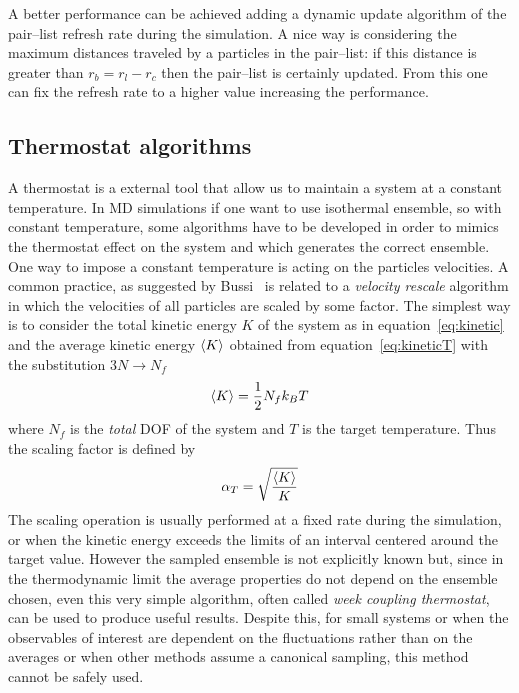 A better performance can be achieved adding a dynamic update algorithm of the pair--list refresh rate during the simulation. A nice way is considering the maximum distances traveled by a particles in the pair--list: if this distance is greater than $r_b = r_l - r_c$ then the pair--list is certainly updated. From this one can fix the refresh rate to a higher value increasing the performance.

\subsection{Thermostat algorithms} %
A thermostat is a external tool that allow us to maintain a system at a constant temperature. In \ac{MD} simulations if one want to use isothermal ensemble, so with constant temperature, some algorithms have to be developed in order to mimics the thermostat effect on the system and which generates the correct ensemble. One way to impose a constant temperature is acting on the particles velocities. A common practice, as suggested by Bussi \etal\, \cite{Bussi} is related to a \textit{velocity rescale} algorithm in which the velocities of all particles are scaled by some factor. The simplest way is to consider the total kinetic energy $K$ of the system as in equation~\eqref{eq:kinetic} and the average kinetic energy $\left \langle K \right \rangle$ obtained from equation~\eqref{eq:kineticT} with the substitution $3N\rightarrow N_f$
\begin{equation*}
	\left \langle K \right \rangle = \frac{1}{2}N_f k_B T
\end{equation*}
where $N_f$ is the \textit{total} \ac{DOF} of the system and $T$ is the target temperature. Thus the scaling factor is defined by
\begin{equation*}
	\alpha_{T} = \sqrt{\frac{\left \langle K \right \rangle}{K}}
\end{equation*}
The scaling operation is usually performed at a fixed rate during the simulation, or when the kinetic energy exceeds the limits of an interval centered around the target value. However the sampled ensemble is not explicitly known but, since in the thermodynamic limit the average properties do not depend on the ensemble chosen, even this very simple algorithm, often called \textit{week coupling thermostat}, can be used to produce useful results. Despite this, for small systems or when the observables of interest are dependent on the fluctuations rather than on the averages or when other methods assume a canonical sampling, this method cannot be safely used.

